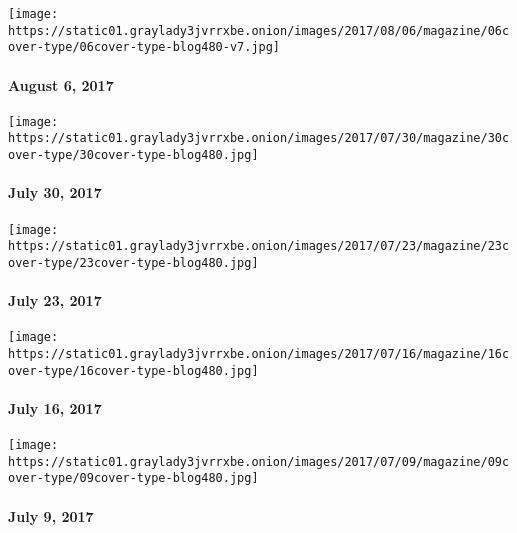 \href{https://www.nytimes3xbfgragh.onion/issue/magazine/2017/08/04/magazine-index}{}

\texttt{[image: https://static01.graylady3jvrrxbe.onion/images/2017/08/06/magazine/06cover-type/06cover-type-blog480-v7.jpg]}

\hypertarget{august-6-2017}{%
\paragraph{August 6, 2017}\label{august-6-2017}}

\href{https://www.nytimes3xbfgragh.onion/issue/magazine/2017/07/28/magazine-index}{}

\texttt{[image: https://static01.graylady3jvrrxbe.onion/images/2017/07/30/magazine/30cover-type/30cover-type-blog480.jpg]}

\hypertarget{july-30-2017}{%
\paragraph{July 30, 2017}\label{july-30-2017}}

\href{https://www.nytimes3xbfgragh.onion/issue/magazine/2017/07/21/magazine-index-20170723}{}

\texttt{[image: https://static01.graylady3jvrrxbe.onion/images/2017/07/23/magazine/23cover-type/23cover-type-blog480.jpg]}

\hypertarget{july-23-2017}{%
\paragraph{July 23, 2017}\label{july-23-2017}}

\href{https://www.nytimes3xbfgragh.onion/issue/magazine/2017/07/14/magazine-index-20170716}{}

\texttt{[image: https://static01.graylady3jvrrxbe.onion/images/2017/07/16/magazine/16cover-type/16cover-type-blog480.jpg]}

\hypertarget{july-16-2017}{%
\paragraph{July 16, 2017}\label{july-16-2017}}

\href{https://www.nytimes3xbfgragh.onion/issue/magazine/2017/07/07/magazine-index-20170709}{}

\texttt{[image: https://static01.graylady3jvrrxbe.onion/images/2017/07/09/magazine/09cover-type/09cover-type-blog480.jpg]}

\hypertarget{july-9-2017}{%
\paragraph{July 9, 2017}\label{july-9-2017}}

